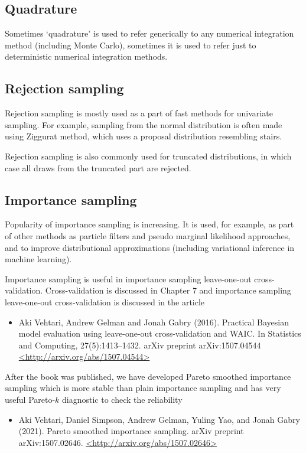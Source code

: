 \documentclass[a4paper,11pt,english]{article}
\begin{document}
 \subsection*{Quadrature}

 Sometimes `quadrature' is used to refer generically to any numerical
 integration method (including Monte Carlo), sometimes it is used to
 refer just to deterministic numerical integration methods.

 \subsection*{Rejection sampling}

 Rejection sampling is mostly used as a part of fast methods for
 univariate sampling. For example, sampling from the normal
 distribution is often made using Ziggurat method, which uses a
 proposal distribution resembling stairs.

 Rejection sampling is also commonly used for truncated distributions,
 in which case all draws from the truncated part are rejected.

 \subsection*{Importance sampling}

 Popularity of importance sampling is increasing. It is used, for
 example, as part of other methods as particle filters and pseudo
 marginal likelihood approaches, and to improve distributional
 approximations (including variational inference in machine learning).

 Importance sampling is useful in importance sampling leave-one-out
 cross-validation. Cross-validation is discussed in Chapter 7 and
 importance sampling leave-one-out cross-validation is discussed in
 the article
 \begin{itemize}
 \item Aki Vehtari, Andrew Gelman and Jonah Gabry (2016). Practical
   Bayesian model evaluation using leave-one-out cross-validation and
   WAIC. In Statistics and Computing, 27(5):1413--1432. arXiv preprint
   arXiv:1507.04544 \url{<http://arxiv.org/abs/1507.04544>}
 \end{itemize}

 After the book was published, we have developed Pareto smoothed
 importance sampling which is more stable than plain importance
 sampling and has very useful Pareto-$k$ diagnostic to check the
 reliability
\begin{itemize}
\item Aki Vehtari, Daniel Simpson, Andrew Gelman, Yuling Yao, and
  Jonah Gabry (2021). Pareto smoothed importance sampling. arXiv
  preprint arXiv:1507.02646. \url{<http://arxiv.org/abs/1507.02646>}
 \end{itemize}
\end{document}
